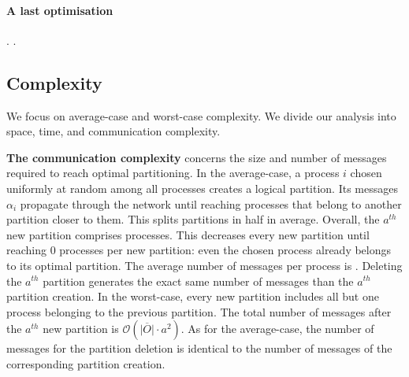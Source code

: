 \paragraph{A last optimisation}
 . .

\subsection{Complexity}
\label{subsec:complexity}


We focus on average-case and worst-case complexity. We divide our
analysis into space, time, and communication complexity.

\textbf{The communication complexity} concerns the size and number of
messages required to reach optimal partitioning. In the average-case,
a process $i$ chosen uniformly at random among all processes creates a
logical partition. Its messages $\alpha_i$ propagate through the
network until reaching processes that belong to another partition
closer to them. This splits partitions in half in average. Overall,
the $a^{th}$ new partition comprises
processes. This decreases every new partition until reaching $0$
processes per new partition: even the chosen process already belongs
to its optimal partition. The average number of messages per process
is .  Deleting the
$a^{th}$ partition generates the exact same number of messages than
the $a^{th}$ partition creation.  In the
worst-case, every new partition includes all but one process belonging
to the previous partition. The total number of messages after the
$a^{th}$ new partition is $\mathcal{O}(\overline{|O|}\cdot a^2)$. As
for the average-case, the number of messages for the partition
deletion is identical to the number of messages of the corresponding
partition creation.

